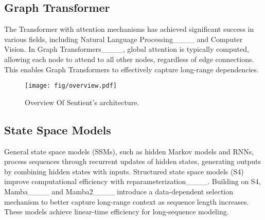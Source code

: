 \subsection{Graph Transformer}

The Transformer with attention mechanisms has achieved significant success in various fields, including Natural Language Processing____ and Computer Vision. In Graph Transformers____, global attention is typically computed, allowing each node to attend to all other nodes, regardless of edge connections. This enables Graph Transformers to effectively capture long-range dependencies.

\begin{figure*}[ht]
    \centering
    \texttt{[image: fig/overview.pdf]}
    \caption{Overview Of Sentient's architecture.}
    \label{fig:Overview}
    \vspace{-0.1in} 
\end{figure*}

\subsection{State Space Models}
General state space models (SSMs), such as hidden Markov models and RNNs, process sequences through recurrent updates of hidden states, generating outputs by combining hidden states with inputs. Structured state space models (S4) improve computational efficiency with reparameterization____.
Building on S4, Mamba____ and Mamba2____ introduce a data-dependent selection mechanism to better capture long-range context as sequence length increases. These models achieve linear-time efficiency for long-sequence modeling.
